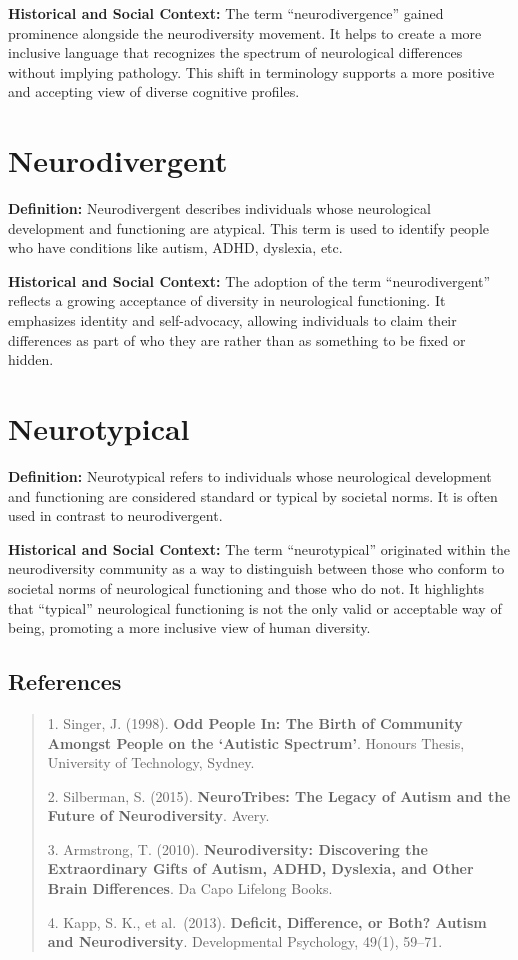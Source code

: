 \documentclass[
  letterpaper,
  DIV=11,
  numbers=noendperiod]{scrreprt}
\begin{document}
\textbf{Historical and Social Context:} The term ``neurodivergence''
gained prominence alongside the neurodiversity movement. It helps to
create a more inclusive language that recognizes the spectrum of
neurological differences without implying pathology. This shift in
terminology supports a more positive and accepting view of diverse
cognitive profiles.

\section{Neurodivergent}\label{neurodivergent}

\textbf{Definition:} Neurodivergent describes individuals whose
neurological development and functioning are atypical. This term is used
to identify people who have conditions like autism, ADHD, dyslexia, etc.

\textbf{Historical and Social Context:} The adoption of the term
``neurodivergent'' reflects a growing acceptance of diversity in
neurological functioning. It emphasizes identity and self-advocacy,
allowing individuals to claim their differences as part of who they are
rather than as something to be fixed or hidden.

\section{Neurotypical}\label{neurotypical}

\textbf{Definition:} Neurotypical refers to individuals whose
neurological development and functioning are considered standard or
typical by societal norms. It is often used in contrast to
neurodivergent.

\textbf{Historical and Social Context:} The term ``neurotypical''
originated within the neurodiversity community as a way to distinguish
between those who conform to societal norms of neurological functioning
and those who do not. It highlights that ``typical'' neurological
functioning is not the only valid or acceptable way of being, promoting
a more inclusive view of human diversity.

\subsection{\texorpdfstring{\textbf{References}}{References}}\label{references}

\begin{quote}
1. Singer, J. (1998). \textbf{Odd People In: The Birth of Community
Amongst People on the `Autistic Spectrum'}. Honours Thesis, University
of Technology, Sydney.

2. Silberman, S. (2015). \textbf{NeuroTribes: The Legacy of Autism and
the Future of Neurodiversity}. Avery.

3. Armstrong, T. (2010). \textbf{Neurodiversity: Discovering the
Extraordinary Gifts of Autism, ADHD, Dyslexia, and Other Brain
Differences}. Da Capo Lifelong Books.

4. Kapp, S. K., et al.~(2013). \textbf{Deficit, Difference, or Both?
Autism and Neurodiversity}. Developmental Psychology, 49(1), 59--71.
\end{quote}
\end{document}
